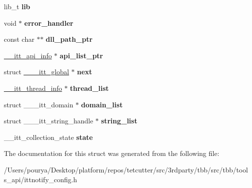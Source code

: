 \begin{DoxyCompactItemize}
\item 
\hypertarget{struct______itt__global_acd607182b03ee49400b6a4ffa69ae5db}{}lib\+\_\+t {\bfseries lib}\label{struct______itt__global_acd607182b03ee49400b6a4ffa69ae5db}

\item 
\hypertarget{struct______itt__global_a5218b05dd00a757cd30e4a324d5a0305}{}void $\ast$ {\bfseries error\+\_\+handler}\label{struct______itt__global_a5218b05dd00a757cd30e4a324d5a0305}

\item 
\hypertarget{struct______itt__global_a809581305da5391f26bd268673155ec7}{}const char $\ast$$\ast$ {\bfseries dll\+\_\+path\+\_\+ptr}\label{struct______itt__global_a809581305da5391f26bd268673155ec7}

\item 
\hypertarget{struct______itt__global_aad92b41f5e69bea276e464b4037d0b95}{}\hyperlink{struct______itt__api__info}{\+\_\+\+\_\+itt\+\_\+api\+\_\+info} $\ast$ {\bfseries api\+\_\+list\+\_\+ptr}\label{struct______itt__global_aad92b41f5e69bea276e464b4037d0b95}

\item 
\hypertarget{struct______itt__global_ab664cd3d54752490af7e535d27d44763}{}struct \hyperlink{struct______itt__global}{\+\_\+\+\_\+\+\_\+itt\+\_\+global} $\ast$ {\bfseries next}\label{struct______itt__global_ab664cd3d54752490af7e535d27d44763}

\item 
\hypertarget{struct______itt__global_aa28553355cdc4eb4f7a51911f15ea938}{}\hyperlink{struct______itt__thread__info}{\+\_\+\+\_\+itt\+\_\+thread\+\_\+info} $\ast$ {\bfseries thread\+\_\+list}\label{struct______itt__global_aa28553355cdc4eb4f7a51911f15ea938}

\item 
\hypertarget{struct______itt__global_a0eb1e7fa6a1bfd35ec682a3998aae7b6}{}struct \+\_\+\+\_\+\+\_\+itt\+\_\+domain $\ast$ {\bfseries domain\+\_\+list}\label{struct______itt__global_a0eb1e7fa6a1bfd35ec682a3998aae7b6}

\item 
\hypertarget{struct______itt__global_ab2f78024685f31d524cf848564bb24da}{}struct \+\_\+\+\_\+\+\_\+itt\+\_\+string\+\_\+handle $\ast$ {\bfseries string\+\_\+list}\label{struct______itt__global_ab2f78024685f31d524cf848564bb24da}

\item 
\hypertarget{struct______itt__global_af2a97fb07952dc430a28042e12732532}{}\+\_\+\+\_\+itt\+\_\+collection\+\_\+state {\bfseries state}\label{struct______itt__global_af2a97fb07952dc430a28042e12732532}

\end{DoxyCompactItemize}


The documentation for this struct was generated from the following file\+:\begin{DoxyCompactItemize}
\item 
/\+Users/pourya/\+Desktop/platform/repos/tetcutter/src/3rdparty/tbb/src/tbb/tools\+\_\+api/ittnotify\+\_\+config.\+h\end{DoxyCompactItemize}
